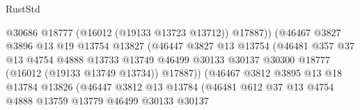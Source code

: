 \begin{lexlean}{RustStd}
\begin{coremodule}
                                          @30686
                                          @18777
                                          (@16012 (@19133 @13723 @13712))
                                          @17887))
                                      (@46467
                                        @3827
                                        @3896
                                        @13
                                        @19
                                        @13754
                                        @13827
                                        (@46447
                                          @3827
                                          @13
                                          @13754
                                          (@46481
                                            @357
                                            @37
                                            @13
                                            @4754
                                            @4888
                                            @13733
                                            @13749
                                            @46499
                                            @30133
                                            @30137
                                            @30300
                                            @18777
                                            (@16012 (@19133 @13749 @13734))
                                            @17887))
                                        (@46467
                                          @3812
                                          @3895
                                          @13
                                          @18
                                          @13784
                                          @13826
                                          (@46447
                                            @3812
                                            @13
                                            @13784
                                            (@46481
                                              @612
                                              @37
                                              @13
                                              @4754
                                              @4888
                                              @13759
                                              @13779
                                              @46499
                                              @30133
                                              @30137

\end{coremodule}
\end{lexlean}
